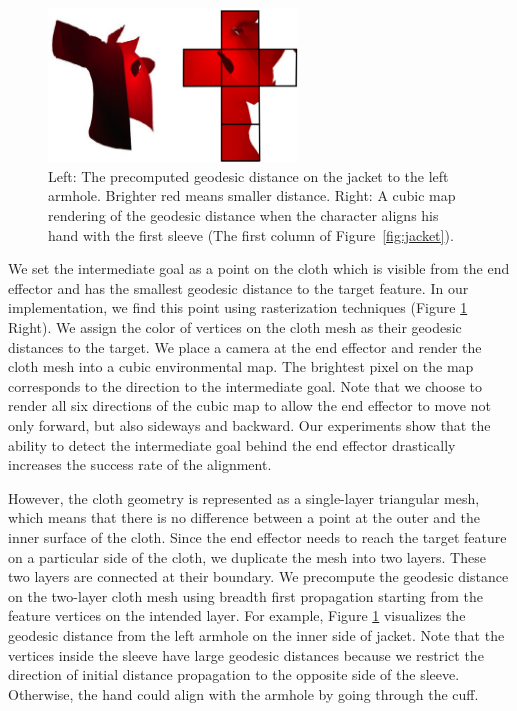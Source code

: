 \begin{figure}[!t]
  \centering
  \includegraphics[width=2.6in]{images/geodesic}
  \caption{Left: The precomputed geodesic distance on the jacket to the left armhole. Brighter red means smaller distance. Right: A cubic map rendering of the geodesic distance when the character aligns his hand with the first sleeve (The first column of Figure~\ref{fig:jacket}).}
  \label{fig:geodesic}
\end{figure}


We set the intermediate goal as a point on the cloth which is visible from the end effector and has the smallest geodesic distance to the target feature. In our implementation, we find this point using rasterization techniques (Figure \ref{fig:geodesic} Right). We assign the color of vertices on the cloth mesh as their geodesic distances to the target. We place a camera at the end effector and render the cloth mesh into a cubic environmental map. The brightest pixel on the map corresponds to the direction to the intermediate goal. Note that we choose to render all six directions of the cubic map to allow the end effector to move not only forward, but also sideways and backward. Our experiments show that the ability to detect the intermediate goal behind the end effector drastically increases the success rate of the alignment.  

However, the cloth geometry is represented as a single-layer triangular mesh, which means that there is no difference between a point at the outer and the inner surface of the cloth. Since the end effector needs to reach the target feature on a particular side of the cloth, we duplicate the mesh into two layers. These two layers are connected at their boundary. We precompute the geodesic distance on the two-layer cloth mesh using breadth first propagation starting from the feature vertices on the intended layer. For example, Figure \ref{fig:geodesic} visualizes the geodesic distance from the left armhole on the inner side of jacket. Note that the vertices inside the sleeve have large geodesic distances because we restrict the direction of initial distance propagation to the opposite side of the sleeve. Otherwise, the hand could align with the armhole by going through the cuff. 

